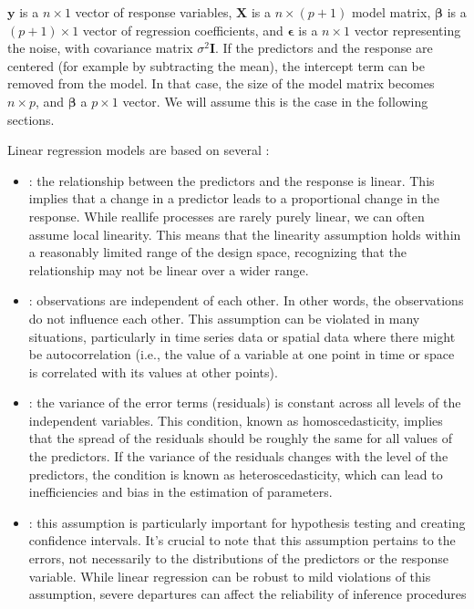 \documentclass[letterpaper,10pt,english]{jupyterBook}
\begin{document}
\sphinxAtStartPar
\(\mathbf{y}\) is a \(n \times 1\) vector of response variables, \(\mathbf{X}\) is a \(n \times (p + 1)\) model matrix, \(\boldsymbol{\beta}\) is a \((p + 1) \times 1\) vector of regression coefficients, and \(\boldsymbol{\epsilon}\) is a \(n \times 1\) vector representing the noise, with covariance matrix \(\sigma^2 \mathbf{I}\). If the predictors and the response are centered (for example by subtracting the mean), the intercept term can be removed from the model. In that case, the size of the model matrix becomes \(n \times p\), and \(\boldsymbol{\beta}\) a \(p \times 1\) vector. We will assume this is the case in the following sections.

\sphinxAtStartPar
Linear regression models are based on several :
\begin{itemize}
\item {} 
\sphinxAtStartPar
{}: the relationship between the predictors and the response is linear. This implies that a change in a predictor leads to a proportional change in the response. While real\sphinxhyphen{}life processes are rarely purely linear, we can often assume local linearity. This means that the linearity assumption holds within a reasonably limited range of the design space, recognizing that the relationship may not be linear over a wider range.

\item {} 
\sphinxAtStartPar
{}: observations are independent of each other. In other words, the observations do not influence each other. This assumption can be violated in many situations, particularly in time series data or spatial data where there might be autocorrelation (i.e., the value of a variable at one point in time or space is correlated with its values at other points).

\item {} 
\sphinxAtStartPar
{}: the variance of the error terms (residuals) is constant across all levels of the independent variables. This condition, known as homoscedasticity, implies that the spread of the residuals should be roughly the same for all values of the predictors. If the variance of the residuals changes with the level of the predictors, the condition is known as heteroscedasticity, which can lead to inefficiencies and bias in the estimation of parameters.

\item {} 
\sphinxAtStartPar
{}: this assumption is particularly important for hypothesis testing and creating confidence intervals. It’s crucial to note that this assumption pertains to the errors, not necessarily to the distributions of the predictors or the response variable. While linear regression can be robust to mild violations of this assumption, severe departures can affect the reliability of inference procedures

\end{itemize}
\end{document}
